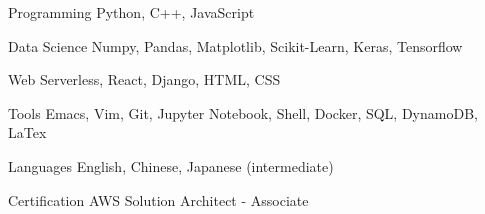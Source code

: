 


\begin{cvskills}


\cvskill
{Programming}
{Python, C++, JavaScript}


\cvskill
{Data Science}
{Numpy, Pandas, Matplotlib, Scikit-Learn, Keras, Tensorflow}


\cvskill
{Web}
{Serverless, React, Django, HTML, CSS}


\cvskill
{Tools}
{Emacs, Vim, Git, Jupyter Notebook, Shell, Docker, SQL, DynamoDB, LaTex}


\cvskill
{Languages}
{English, Chinese, Japanese (intermediate)}


\cvskill
{Certification}
{AWS Solution Architect - Associate}


\end{cvskills}